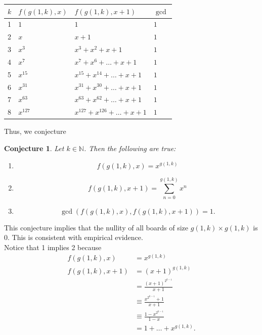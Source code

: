 \documentclass{article}
\newtheorem{conjecture}{Conjecture}
\newcommand{\N}{\mathbb{N}}
\begin{document}
	\begin{table}[H]
		\renewcommand{\arraystretch}{1.5}
		\centering
		\begin{tabular}{|l||l|l|l|}
			\hline
			$k$ & $f(g(1,k),x)$ & $f(g(1,k),x+1)$ & $\gcd$  \\
			\hline\hline
			1 & $1$ & $1$ & $1$ \\
			\hline
			2 & $x$ & $x+1$ & $1$ \\
			\hline
			3 & $x^3$ & $x^3+x^2+x+1$ & $1$ \\
			\hline
			4 & $x^7$ & $x^7 + x^6 + \dots + x + 1$ & $1$ \\
			\hline
			5 & $x^{15}$ & $x^{15} + x^{14} + \dots + x + 1$ & $1$ \\
			\hline
			6 & $x^{31}$ & $x^{31} + x^{30} + \dots + x + 1$ & $1$ \\
			\hline
			7 & $x^{63}$ & $x^{63} + x^{62} + \dots + x + 1$ & $1$ \\
			\hline
			8 & $x^{127}$ & $x^{127} + x^{126} + \dots + x + 1$ & $1$ \\
			\hline  
		\end{tabular}
	\end{table}
	Thus, we conjecture
	\begin{conjecture}
		Let $k \in \N$.
		Then the following are true:
		\begin{enumerate}
			\item
			\begin{equation*}
				f(g(1,k),x) = x^{g(1,k)}
			\end{equation*}
			\item
			\begin{equation*}
				f(g(1,k),x+1) = \sum_{n=0}^{g(1,k)}{x^n}
			\end{equation*}
			\item
			\begin{equation*}
				\gcd\left({f(g(1,k),x), f(g(1,k),x+1)}\right) = 1.
			\end{equation*}
		\end{enumerate}
	\end{conjecture}
	This conjecture implies that the nullity of all boards of size $g(1,k) \times g(1,k)$ is $0$.
	This is consistent with empirical evidence. \\
	
	Notice that 1 implies 2 because
	\begin{align*}
		f(g(1,k),x) &= x^{g(1,k)} \\
		f(g(1,k),x+1) &= (x+1)^{g(1,k)} \\
			&= \frac{(x+1)^{2^{k-1}}}{x+1} \\
			&\equiv \frac{x^{2^{k-1}}+1}{x+1} \\
			&\equiv \frac{1-x^{2^{k-1}}}{1-x} \\
			&= 1 + \dots + x^{g(1,k)}.
	\end{align*}
	
\end{document}
